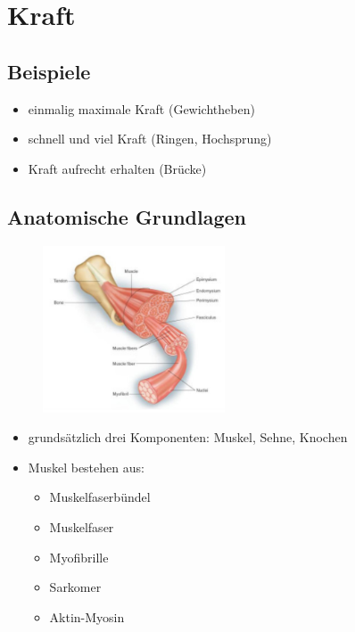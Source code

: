 
\section{Kraft}

\subsection{Beispiele}
\begin{itemize}
    \item einmalig maximale Kraft (Gewichtheben)
    \item schnell und viel Kraft (Ringen, Hochsprung)
    \item Kraft aufrecht erhalten (Brücke)
\end{itemize}

\subsection{Anatomische Grundlagen}

\begin{figure}
  \begin{center}
    \includegraphics[width=0.48\textwidth]{pictures/muskeln}
  \end{center}
\end{figure}

\begin{itemize}
    \item grundsätzlich drei Komponenten: Muskel, Sehne, Knochen
    \item Muskel bestehen aus:
    \begin{itemize}
        \item Muskelfaserbündel
        \item Muskelfaser
        \item Myofibrille
        \item Sarkomer
        \item Aktin-Myosin
    \end{itemize}
\end{itemize}

